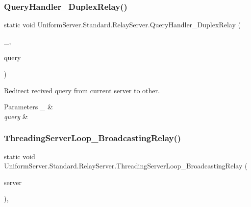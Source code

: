 \subsubsection{\texorpdfstring{Query\+Handler\+\_\+\+Duplex\+Relay()}{QueryHandler\_DuplexRelay()}}
{\footnotesize\ttfamily static void Uniform\+Server.\+Standard.\+Relay\+Server.\+Query\+Handler\+\_\+\+Duplex\+Relay (\begin{DoxyParamCaption}\item[{\mbox{\hyperlink{class_pipes_provider_1_1_server_1_1_transmission_controllers_1_1_base_server_transmission_controller}{Base\+Server\+Transmission\+Controller}}}]{\+\_\+,  }\item[{string}]{query }\end{DoxyParamCaption})\hspace{0.3cm}{\ttfamily [static]}}



Redirect recived query from current server to other. 


\begin{DoxyParams}{Parameters}
{\em \+\_\+} & \\
\hline
{\em query} & \\
\hline
\end{DoxyParams}
\mbox{\label{class_uniform_server_1_1_standard_1_1_relay_server_a5940f8db2d25ff38ecdb7e5ab74063f9}} 
\subsubsection{\texorpdfstring{Threading\+Server\+Loop\+\_\+\+Broadcasting\+Relay()}{ThreadingServerLoop\_BroadcastingRelay()}}
{\footnotesize\ttfamily static void Uniform\+Server.\+Standard.\+Relay\+Server.\+Threading\+Server\+Loop\+\_\+\+Broadcasting\+Relay (\begin{DoxyParamCaption}\item[{object}]{server }\end{DoxyParamCaption})\hspace{0.3cm}{\ttfamily [static]}, {\ttfamily [protected]}}



